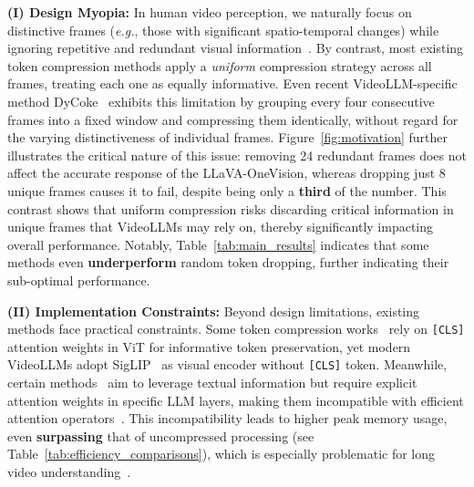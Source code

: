 \noindent \textbf{(I) Design Myopia:} In human video perception, we naturally focus on distinctive frames (\textit{e.g.}, those with significant spatio-temporal changes) while ignoring repetitive and redundant visual information~\cite{ma2025mmg-vid}. By contrast, most existing token compression methods apply a \textit{uniform} compression strategy across all frames, treating each one as equally informative. Even recent VideoLLM-specific method DyCoke~\cite{tao2024dycoke} exhibits this limitation by grouping every four consecutive frames into a fixed window and compressing them identically, without regard for the varying distinctiveness of individual frames. Figure~\ref{fig:motivation} further illustrates the critical nature of this issue: removing 24 redundant frames does not affect the accurate response of the LLaVA-OneVision, whereas dropping just 8 unique frames causes it to fail, despite being only a \textbf{third} of the number. This contrast shows that uniform compression risks discarding critical information in unique frames that VideoLLMs may rely on, thereby significantly impacting overall performance. Notably, Table~\ref{tab:main_results} indicates that some methods even \textbf{underperform} random token dropping, further indicating their sub-optimal performance.




\noindent \textbf{(II) Implementation Constraints:} 
Beyond design limitations, existing methods face practical constraints. Some token compression works~\cite{Zhang:FasterVLM,Liu2024:MUSTDrop} rely on \texttt{[CLS]} attention weights in ViT for informative token preservation, yet modern VideoLLMs adopt SigLIP~\cite{ZhaiM0B23:SigLIP} as visual encoder without \texttt{[CLS]} token. Meanwhile, certain methods~\cite{Zhang:SparseVLM,xing2024pdrop} aim to leverage textual information but require explicit attention weights in specific LLM layers, making them incompatible with efficient attention operators~\cite{Dao2022:FlashAttention}. This incompatibility leads to higher peak memory usage, even \textbf{surpassing} that of uncompressed processing (see Table~\ref{tab:efficiency_comparisons}), which is especially problematic for long video understanding~\cite{wen2025token,wen2025dart}.


